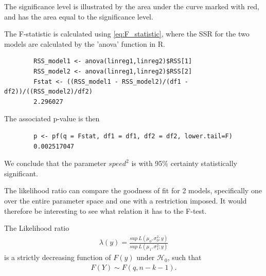\begin{example}
    The significance level is illustrated by the area under the curve marked with red, and has the area equal to the significance level.
    
    The F-statistic is calculated using \eqref{eq:F_statistic}, where the SSR for the two models are calculated by the 'anova' function in R. 
    \begin{lstlisting}
        RSS_model1 <- anova(linreg1,linreg2)$RSS[1]
        RSS_model2 <- anova(linreg1,linreg2)$RSS[2]
        Fstat <- ((RSS_model1 - RSS_model2)/(df1 - df2))/((RSS_model2)/df2)
        2.296027
    \end{lstlisting}
    
    The associated p-value is then
    
    \begin{lstlisting}
        p <- pf(q = Fstat, df1 = df1, df2 = df2, lower.tail=F)
        0.002517047
    \end{lstlisting}
    
    We conclude that the parameter $speed^2$ is with 95\% certainty statistically significant.
\end{example}

The likelihood ratio can compare the goodness of fit for 2 models, specifically one over the entire parameter space and one with a restriction imposed.
It would therefore be interesting to see what relation it has to the F-test.

\begin{theorem}
\label{th:Likelihood_ratio_linear_models}
    The Likelihood ratio
    \begin{align*}
        \lambda(y) = \frac{sup \ L(\mu_0, \sigma_0^2; y)}{sup \ L(\mu_1, \sigma_1^2; y)}
    \end{align*}
    is a strictly decreasing function of $F(y)$ under $\mathcal{H}_0$, such that
    \begin{align*}
        F(Y) \sim F(q, n-k-1).
    \end{align*}
\end{theorem}

